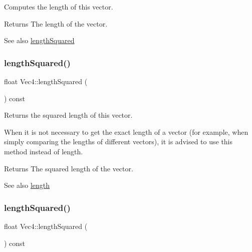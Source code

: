 Computes the length of this vector.

\begin{DoxyReturn}{Returns}
The length of the vector.
\end{DoxyReturn}
\begin{DoxySeeAlso}{See also}
\hyperlink{classVec4_a06243f2009024c79f544c99acf621e53}{length\+Squared} 
\end{DoxySeeAlso}
\mbox{\label{classVec4_a06243f2009024c79f544c99acf621e53}} 
\subsubsection{\texorpdfstring{length\+Squared()}{lengthSquared()}\hspace{0.1cm}{\footnotesize\ttfamily [1/2]}}
{\footnotesize\ttfamily float Vec4\+::length\+Squared (\begin{DoxyParamCaption}{ }\end{DoxyParamCaption}) const}

Returns the squared length of this vector.

When it is not necessary to get the exact length of a vector (for example, when simply comparing the lengths of different vectors), it is advised to use this method instead of length.

\begin{DoxyReturn}{Returns}
The squared length of the vector.
\end{DoxyReturn}
\begin{DoxySeeAlso}{See also}
\hyperlink{classVec4_ac42249851a68eaf15815285b76763058}{length} 
\end{DoxySeeAlso}
\mbox{\label{classVec4_a06243f2009024c79f544c99acf621e53}} 
\subsubsection{\texorpdfstring{length\+Squared()}{lengthSquared()}\hspace{0.1cm}{\footnotesize\ttfamily [2/2]}}
{\footnotesize\ttfamily float Vec4\+::length\+Squared (\begin{DoxyParamCaption}{ }\end{DoxyParamCaption}) const}

